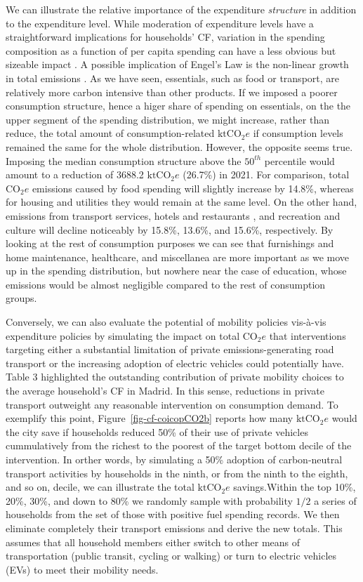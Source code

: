 \documentclass[
  10pt,
  twocolumn]{aft}
\begin{document}
We can illustrate the relative importance of the expenditure
\emph{structure} in addition to the expenditure level. While moderation
of expenditure levels have a straightforward implications for
households' CF, variation in the spending composition as a function of
per capita spending can have a less obvious but sizeable impact
\citep{levinsonEnvironmentalEngelCurves2015}. A possible implication of
Engel's Law is the non-linear growth in total emissions
\citep{browningEngelLaw2018, levinsonEnvironmentalEngelCurves2015}. As
we have seen, essentials, such as food or transport, are relatively more
carbon intensive than other products. If we imposed a poorer consumption
structure, hence a higer share of spending on essentials, on the the
upper segment of the spending distribution, we might increase, rather
than reduce, the total amount of consumption-related \(\text{ktCO}_2e\)
if consumption levels remained the same for the whole distribution.
However, the opposite seems true. Imposing the median consumption
structure above the \(50^{th}\) percentile would amount to a reduction
of 3688.2 \(\text{ktCO}_2e\) (26.7\%) in 2021. For comparison, total
\(\text{CO}_2e\) emissions caused by food spending will slightly
increase by 14.8\%, whereas for housing and utilities they would remain
at the same level. On the other hand, emissions from transport services,
hotels and restaurants , and recreation and culture will decline
noticeably by 15.8\%, 13.6\%, and 15.6\%, respectively. By looking at
the rest of consumption purposes we can see that furnishings and home
maintenance, healthcare, and miscellanea are more important as we move
up in the spending distribution, but nowhere near the case of education,
whose emissions would be almost negligible compared to the rest of
consumption groups.

Conversely, we can also evaluate the potential of mobility policies
vis-à-vis expenditure policies by simulating the impact on total
\(\text{CO}_2e\) that interventions targeting either a substantial
limitation of private emissions-generating road transport or the
increasing adoption of electric vehicles could potentially have. Table 3
highlighted the outstanding contribution of private mobility choices to
the average household's CF in Madrid. In this sense, reductions in
private transport outweight any reasonable intervention on consumption
demand. To exemplify this point, Figure~\ref{fig-cf-coicopCO2b} reports
how many \(\text{ktCO}_2e\) would the city save if households reduced
50\% of their use of private vehicles cummulatively from the richest to
the poorest of the target bottom decile of the intervention. In orther
words, by simulating a 50\% adoption of carbon-neutral transport
activities by households in the ninth, or from the ninth to the eighth,
and so on, decile, we can illustrate the total \(\text{ktCO}_2e\)
savings.Within the top 10\%, 20\%, 30\%, and down to 80\% we randomly
sample with probability \(1/2\) a series of households from the set of
those with positive fuel spending records. We then eliminate completely
their transport emissions and derive the new totals. This assumes that
all household members either switch to other means of transportation
(public transit, cycling or walking) or turn to electric vehicles (EVs)
to meet their mobility needs.
\end{document}
